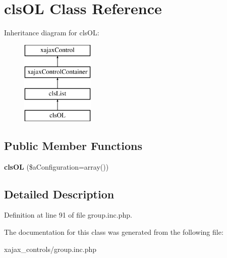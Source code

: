 \hypertarget{classclsOL}{
\section{clsOL Class Reference}
\label{classclsOL}
}
Inheritance diagram for clsOL:\begin{figure}[H]
\begin{center}
\leavevmode
\includegraphics[height=4.000000cm]{classclsOL}
\end{center}
\end{figure}
\subsection*{Public Member Functions}
\begin{DoxyCompactItemize}
\item 
\hypertarget{classclsOL_ae53873e5db53a8844cf493172f72476c}{
{\bfseries clsOL} (\$aConfiguration=array())}
\label{classclsOL_ae53873e5db53a8844cf493172f72476c}

\end{DoxyCompactItemize}


\subsection{Detailed Description}


Definition at line 91 of file group.inc.php.



The documentation for this class was generated from the following file:\begin{DoxyCompactItemize}
\item 
xajax\_\-controls/group.inc.php\end{DoxyCompactItemize}
